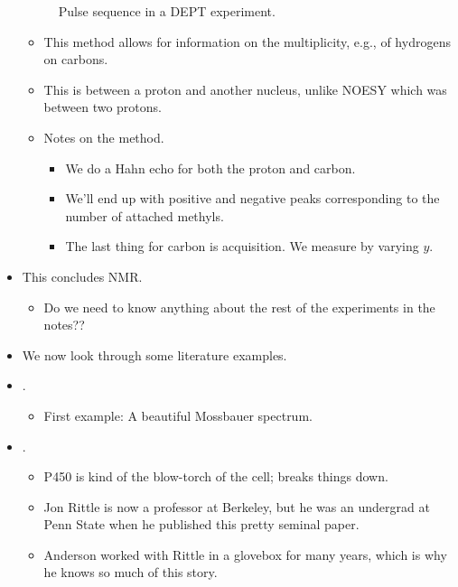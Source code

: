 \documentclass[../notes.tex]{subfiles}
\begin{document}
\begin{itemize}
\begin{figure}[h!]
        \caption{Pulse sequence in a DEPT experiment.}
        \label{fig:DEPTpulses}
    \end{figure}
    \begin{itemize}
        \item This method allows for information on the multiplicity, e.g., of hydrogens on carbons.
        \item This is between a proton and another nucleus, unlike NOESY which was between two protons.
        \item Notes on the method.
        \begin{itemize}
            \item We do a Hahn echo for both the proton and carbon.
            \item We'll end up with positive and negative peaks corresponding to the number of attached methyls.
            \item The last thing for carbon is acquisition. We measure by varying $y$.
        \end{itemize}
    \end{itemize}
    \item This concludes NMR.
    \begin{itemize}
        \item Do we need to know anything about the rest of the experiments in the notes??
    \end{itemize}
    \item We now look through some literature examples.
    \item \textcite{bib:MossbauerSpectrum}.
    \begin{itemize}
        \item First example: A beautiful Mossbauer spectrum.
    \end{itemize}
    \item \textcite{bib:RittleP450}.
    \begin{itemize}
        \item P450 is kind of the blow-torch of the cell; breaks things down.
        \item Jon Rittle is now a professor at Berkeley, but he was an undergrad at Penn State when he published this pretty seminal paper.
        \item Anderson worked with Rittle in a glovebox for many years, which is why he knows so much of this story.

\end{itemize}
\end{itemize}
\end{document}
